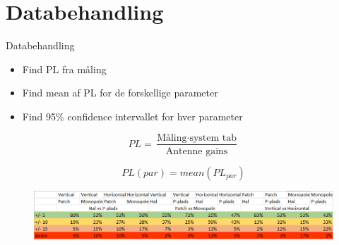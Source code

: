 \section{Databehandling}
\begin{frame}{Databehandling}

\begin{itemize}
\item Find PL fra måling
\item Find mean af PL for de forskellige parameter
\item Find 95\% confidence intervallet for hver parameter
\end{itemize}
\begin{minipage}{0.54\textwidth}
\begin{equation*}
PL = \frac{\text{Måling}\cdot\text{system tab}}{\text{Antenne gains}}
\end{equation*}
\end{minipage}%
\begin{minipage}{0.45\textwidth}
\begin{equation*}
PL(par) = mean\left(PL_{par}\right)
\end{equation*}
\end{minipage}
\begin{figure}
\centering
\includegraphics[width=\columnwidth]{figures/Data.png}
\end{figure}
\end{frame}


